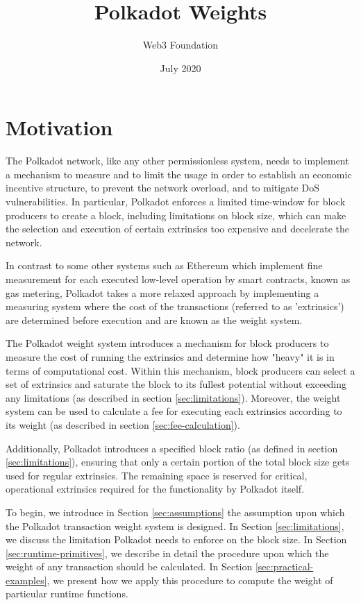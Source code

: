 \documentclass[11pt,a4paper]{article}
\begin{document}
\title{Polkadot Weights}
\author{Web3 Foundation}
\date{July 2020}
\maketitle

\section{Motivation}

The Polkadot network, like any other permissionless system, needs to implement a
mechanism to measure and to limit the usage in order to establish an economic
incentive structure, to prevent the network overload, and to mitigate DoS
vulnerabilities. In particular, Polkadot enforces a limited time-window for
block producers to create a block, including limitations on block size, which
can make the selection and execution of certain extrinsics too expensive and
decelerate the network.
\newline

In contrast to some other systems such as Ethereum which implement fine
measurement for each executed low-level operation by smart contracts, known as
gas metering, Polkadot takes a more relaxed approach by implementing a measuring
system where the cost of the transactions (referred to as 'extrinsics') are
determined before execution and are known as the weight system.

The Polkadot weight system introduces a mechanism for block producers to measure
the cost of running the extrinsics and determine how "heavy" it is in terms of
computational cost. Within this mechanism, block producers can select a set of
extrinsics and saturate the block to its fullest potential without exceeding any
limitations (as described in section \ref{sec:limitations}). Moreover, the
weight system can be used to calculate a fee for executing each extrinsics
according to its weight (as described in section \ref{sec:fee-calculation}).
\newline

Additionally, Polkadot introduces a specified block ratio (as defined in section
\ref{sec:limitations}), ensuring that only a certain portion of the total block
size gets used for regular extrinsics. The remaining space is reserved for
critical, operational extrinsics required for the functionality by Polkadot
itself.

To begin, we introduce in Section \ref{sec:assumptions} the assumption upon
which the Polkadot transaction weight system is designed. In Section
\ref{sec:limitations}, we discuss the limitation Polkadot needs to enforce on
the block size. In Section \ref{sec:runtime-primitives}, we describe in detail
the procedure upon which the weight of any transaction should be calculated. In
Section \ref{sec:practical-examples}, we present how we apply this procedure to
compute the weight of particular runtime functions.
\end{document}
